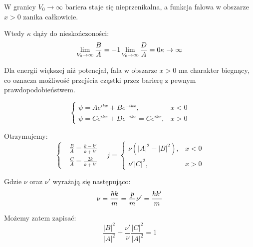 W granicy $V_0 \to \infty$ bariera staje się nieprzenikalna, a funkcja falowa w obszarze $x>0$ zanika całkowicie.

Wtedy $\kappa$ dąży do nieskończoności:
\begin{equation*}
    \lim_{V_0 \to \infty} \frac{B}{A} = -1 \\
    \lim_{V_0 \to \infty} \frac{D}{A} = 0 \\
    \kappa \to \infty
\end{equation*}

Dla energii większej niż potencjał, fala w obszarze $x>0$ ma charakter biegnący,
co oznacza możliwość przejścia cząstki przez barierę z pewnym prawdopodobieństwem.

\begin{equation*}
    \begin{cases}
        \psi = A e^{ikx} + B e^{-ikx}, & x < 0 \\
        \psi = C e^{ikx} + D e^{-ikx} = C e^{ikx}, & x > 0
    \end{cases}
\end{equation*}

Otrzymujemy:
\begin{equation*}
    \left\{
    \begin{aligned}
        & \frac{B}{A} = \frac{k - k'}{k + k'} \\
        & \frac{C}{A} = \frac{2k}{k + k'}
    \end{aligned}
    \right.
    \quad
    j = 
    \begin{cases}
        \nu \left( |A|^2 - |B|^2 \right), & x < 0 \\
        \nu' |C|^2, & x > 0
    \end{cases}
\end{equation*}

Gdzie $\nu$ oraz $\nu'$ wyrażają się następująco:
\begin{equation*}
    \nu = \frac{\hbar k}{m} = \frac{p}{m} \\
    \nu' = \frac{\hbar k'}{m}
\end{equation*}

Możemy zatem zapisać:
\begin{equation*}
    \frac{\left| B \right|^2}{\left| A \right|^2} + \frac{\nu'}{\nu} \frac{\left| C \right|^2}{\left| A \right|^2} = 1
\end{equation*}

